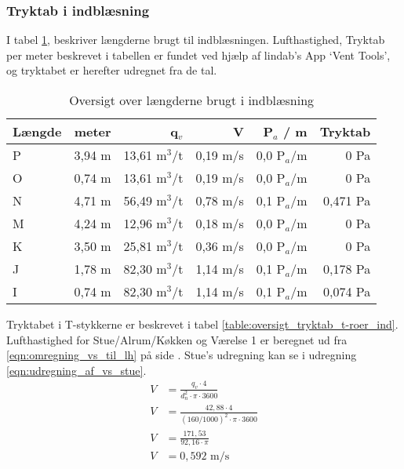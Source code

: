 \subsubsection{Tryktab i indblæsning} \label{subsub:tryktab_indblaesning}
I tabel \ref{table:oversigt_l_indblaesning}, beskriver længderne brugt til indblæsningen. 
Lufthastighed, Tryktab per meter beskrevet i tabellen er fundet ved hjælp af lindab's App `Vent Tools',
og tryktabet er herefter udregnet fra de tal.
\begin{table}[h!]
    \begin{center}
       \begin{tabular}{|l|r|r|r|r|r|}
           \hline
           Længde & meter & q$_{v}$ & V & P$_{a}$ / m & Tryktab\\
           \hline
            P & 3,94 m & 13,61 m$^3$/t & 0,19 m/s & 0,0 P$_{a}$/m & 0 Pa\\
            O & 0,74 m & 13,61 m$^3$/t & 0,19 m/s & 0,0 P$_{a}$/m & 0 Pa\\
            N & 4,71 m & 56,49 m$^3$/t & 0,78 m/s & 0,1 P$_{a}$/m & 0,471 Pa\\
            M & 4,24 m & 12,96 m$^3$/t & 0,18 m/s & 0,0 P$_{a}$/m & 0 Pa\\
            K & 3,50 m & 25,81 m$^3$/t & 0,36 m/s & 0,0 P$_{a}$/m & 0 Pa\\
            J & 1,78 m & 82,30 m$^3$/t & 1,14 m/s & 0,1 P$_{a}$/m & 0,178 Pa\\
            I & 0,74 m & 82,30 m$^3$/t & 1,14 m/s & 0,1 P$_{a}$/m & 0,074 Pa\\
           \hline
       \end{tabular}
   \end{center}
   \caption{Oversigt over længderne brugt i indblæsning}
   \label{table:oversigt_l_indblaesning}
\end{table}
Tryktabet i T-stykkerne er beskrevet i tabel \ref{table:oversigt_tryktab_t-roer_ind}. 
Lufthastighed for Stue/Alrum/Køkken og Værelse 1 er beregnet ud fra \ref{eqn:omregning_vs_til_lh} på side \pageref{eqn:omregning_vs_til_lh}.
Stue's udregning kan se i udregning \ref{eqn:udregning_af_vs_stue}.
\begin{align} \label{eqn:udregning_af_vs_stue}
    V     &= \frac{ q_v \cdot 4 }{ d_{n}^{2} \cdot \pi \cdot 3600 } \nonumber \\
    V     &= \frac{ 42,88 \cdot 4 }{ (160/1000)^{2} \cdot \pi \cdot 3600 } \nonumber \\
    V     &= \frac{ 171,53 }{ 92,16 \cdot \pi } \nonumber \\
    V     &= 0,592 \text{ m/s}
\end{align}
